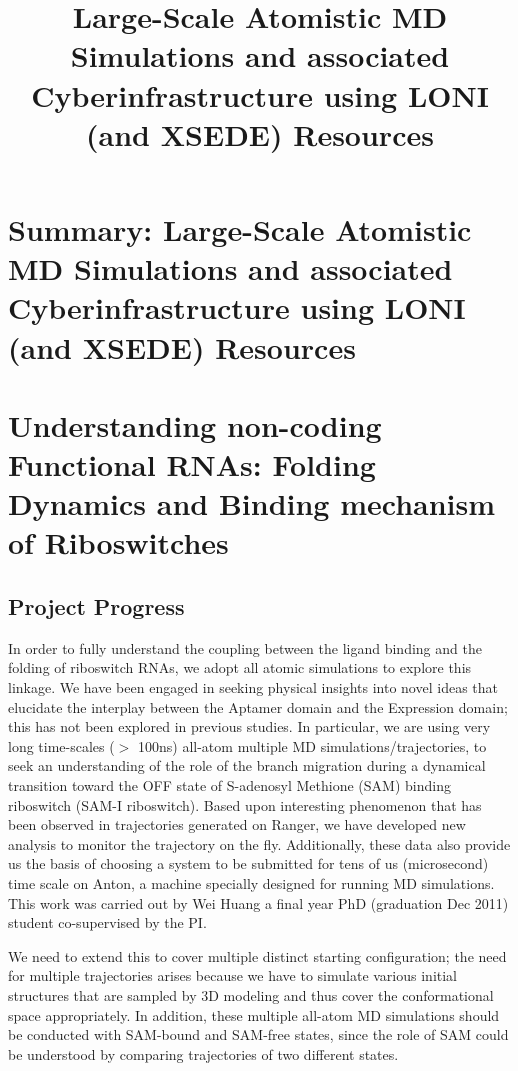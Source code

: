 \documentclass[a4paper,11pt]{article}
\begin{document}
\title{\Large Large-Scale Atomistic MD Simulations and associated
  Cyberinfrastructure using LONI (and XSEDE) Resources}

\date{}

 
\section*{Summary: Large-Scale Atomistic MD Simulations and associated Cyberinfrastructure using LONI (and XSEDE) Resources}

\section{Understanding non-coding Functional RNAs: 
Folding Dynamics and Binding mechanism of Riboswitches}

\subsection{Project Progress}
In order to fully understand the coupling between the ligand binding and the folding of riboswitch RNAs, we adopt all atomic simulations to explore this linkage.  We have been engaged in seeking physical insights into novel ideas that elucidate the interplay between the Aptamer domain and the Expression domain; this has not been explored in previous studies.  In particular, we are using very long time-scales ($>$ 100ns) all-atom multiple MD simulations/trajectories, to seek an understanding of the role of the branch migration during a dynamical transition toward the OFF state of S-adenosyl Methione (SAM) binding riboswitch (SAM-I riboswitch).  Based upon interesting phenomenon that has been observed in trajectories generated on Ranger, we have developed new analysis to monitor the trajectory on the fly. Additionally, these data also provide us the basis of choosing a system to be submitted for tens of us (microsecond) time scale on Anton, a machine specially designed for running MD simulations. This work was carried out by Wei Huang a final year PhD (graduation Dec 2011) student co-supervised by the PI. 

We need to extend this to cover multiple distinct starting configuration; the need for multiple trajectories arises because we have to simulate various initial structures that are sampled by 3D modeling and thus cover the conformational space appropriately.  In addition, these multiple all-atom MD simulations should be conducted with SAM-bound and SAM-free states, since the role of SAM could be understood by comparing trajectories of two different states.
\end{document}
